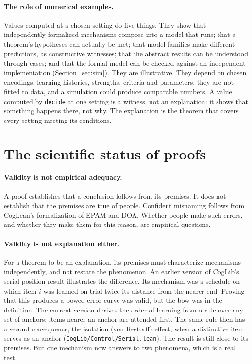 \documentclass[11pt]{article}
\newcommand{\code}[1]{\texttt{#1}}
\begin{document}
\paragraph{The role of numerical examples.} Values computed at a chosen setting do five things. They show that independently formalized mechanisms compose into a model that runs; that a theorem's hypotheses can actually be met; that model families make different predictions, as constructive witnesses; that the abstract results can be understood through cases; and that the formal model can be checked against an independent implementation (Section~\ref{sec:sim}). They are illustrative. They depend on chosen encodings, learning histories, strengths, criteria and parameters, they are not fitted to data, and a simulation could produce comparable numbers. A value computed by \code{decide} at one setting is a witness, not an explanation: it shows that something happens there, not why. The explanation is the theorem that covers every setting meeting its conditions.

\section{The scientific status of proofs}
\label{sec:status}

\paragraph{Validity is not empirical adequacy.} A proof establishes that a conclusion follows from its premises. It does not establish that the premises are true of people. Confident misnaming follows from CogLean's formalization of EPAM and DOA. Whether people make such errors, and whether they make them for this reason, are empirical questions.

\paragraph{Validity is not explanation either.} For a theorem to be an explanation, its premises must characterize mechanisms independently, and not restate the phenomenon. An earlier version of CogLib's serial-position result illustrates the difference. Its mechanism was a schedule on which item $i$ was learned on trial twice its distance from the nearer end. Proving that this produces a bowed error curve was valid, but the bow was in the definition. The current version derives the order of learning from a rule over any set of anchors: items nearer an anchor are attended first. The same rule then has a second consequence, the isolation (von Restorff) effect, when a distinctive item serves as an anchor (\code{CogLib/Control/Serial.lean}). The result is still close to its premises. But one mechanism now answers to two phenomena, which is a real test.
\end{document}
